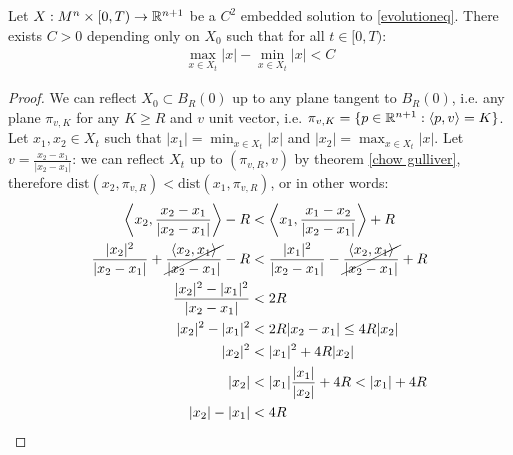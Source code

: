 \begin{cor}
	Let $X:M^n\times [0,T) \rightarrow \mathbb{R}^{n+1}$ be a $C^2$ embedded solution to \ref{evolutioneq}. There exists $C>0$ depending only on $X_0$ such that for all $t\in[0, T)$: 
	\begin{align*}
		\max_{x\in X_t} |x| - \min_{x\in X_t} |x| < C
	\end{align*}
\end{cor}
\begin{proof}
	We can reflect $X_0\subset B_R(0)$ up to any plane tangent to  $B_R(0)$, i.e. any plane $\pi_{v, K}$ for any $K\geq R$ and $v$ unit vector, i.e.  $\pi_{v, K}=\{p \in \mathbb{R}^{n+1} : \langle p, v \rangle = K\}$. Let $x_1, x_2\in X_t$ such that $|x_1|=\min_{x\in X_t} |x|$ and  $|x_2|=\max_{x\in X_t} |x|$. Let $v=\frac{x_2-x_1}{\vert x_2-x_1 \vert}$: we can reflect $X_t$ up to $(\pi_{v, R}, v)$ by theorem \ref{chow gulliver}, therefore $\mathrm{dist}(x_2, \pi_{v, R}) < \mathrm{dist}(x_1, \pi_{v, R})$, or in other words:
	\begin{align*}
		 \left\langle x_2, \frac{x_2-x_1}{\vert x_2-x_1 \vert} \right\rangle - R &< 
		 \left\langle x_1, \frac{x_1-x_2}{\vert x_2-x_1 \vert} \right\rangle + R\\
		 \frac{|x_2|^2}{\vert x_2-x_1 \vert} + \cancel{\frac{\left\langle x_2, x_1\right\rangle}{\vert x_2-x_1 \vert}}  - R &< 
		 \frac{|x_1|^2}{\vert x_2-x_1 \vert} - \cancel{\frac{\left\langle x_2, x_1\right\rangle}{\vert x_2-x_1 \vert}}  + R\\
		 \frac{|x_2|^2 - |x_1|^2}{\vert x_2-x_1 \vert} &< 
		  2R\\
		  |x_2|^2 - |x_1|^2 &< 
		  2R \vert x_2-x_1 \vert \leq 4R |x_2|\\
		  |x_2|^2 &<|x_1|^2 + 4R |x_2|\\
		  |x_2| &< |x_1| \frac{|x_1|}{|x_2|} + 4R < |x_1| + 4R\\
		  |x_2| -|x_1| &<4R
	\end{align*}
\end{proof}



